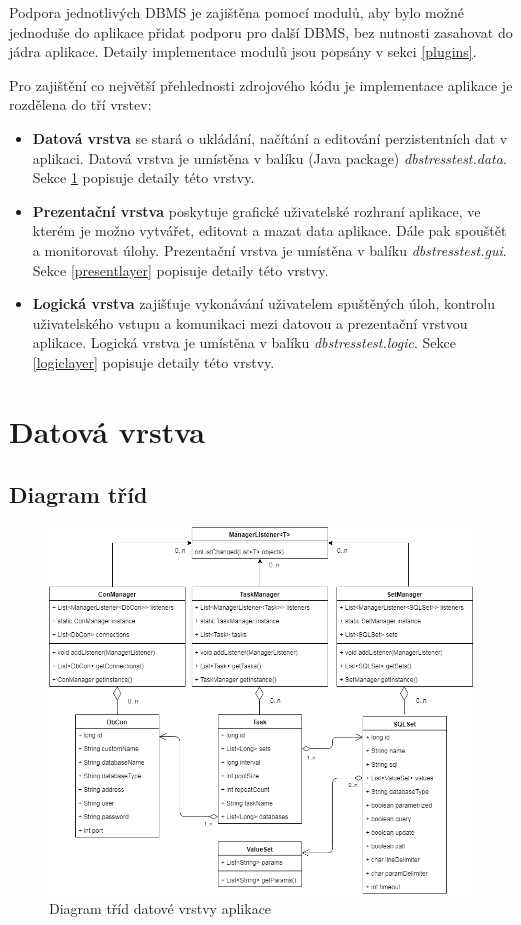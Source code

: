 \documentclass[czech,bachelor,public,dept460,male,cpdeclaration,twoside]{diploma}
\begin{document}
Podpora jednotlivých DBMS je zajištěna pomocí modulů, aby bylo možné jednoduše do aplikace přidat podporu pro další DBMS, bez nutnosti zasahovat do jádra aplikace. Detaily implementace modulů jsou popsány v sekci \ref{plugins}.

Pro zajištění co největší přehlednosti zdrojového kódu je implementace aplikace je rozdělena do tří vrstev:
\begin{itemize}
  	\item \textbf{Datová vrstva} se stará o ukládání, načítání a editování perzistentních dat v aplikaci. Datová vrstva je umístěna v balíku (Java package) \textit{dbstresstest.data}. Sekce \ref{datalayer} popisuje detaily této vrstvy.
  	\item \textbf{Prezentační vrstva} poskytuje grafické uživatelské rozhraní aplikace, ve kterém je možno vytvářet, editovat a mazat data aplikace. Dále pak spouštět a monitorovat úlohy. Prezentační vrstva je umístěna v balíku \textit{dbstresstest.gui}. Sekce \ref{presentlayer} popisuje detaily této vrstvy.
  	\item \textbf{Logická vrstva} zajišťuje vykonávání uživatelem spuštěných úloh, kontrolu uživatelského vstupu a komunikaci mezi datovou a prezentační vrstvou aplikace. Logická vrstva je umístěna v balíku \textit{dbstresstest.logic}. Sekce \ref{logiclayer} popisuje detaily této vrstvy.
\end{itemize} 

\section{Datová vrstva} \label{datalayer}

\subsection{Diagram tříd} \label{datadiagram}
\begin{figure}[!htbp]\centering\includegraphics[width=1.0\textwidth]{Figures/datadiagram.png}\caption{Diagram tříd datové vrstvy aplikace}
\end{figure}
\end{document}
